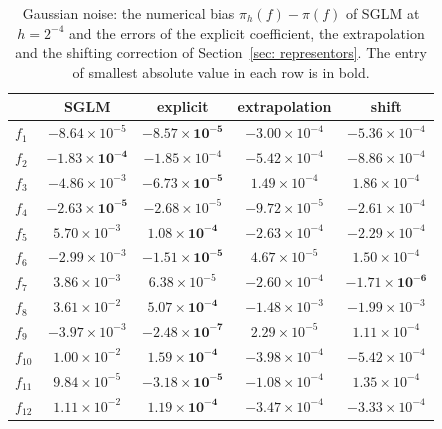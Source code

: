 \begin{table}[htb]
\centering
\small
\begin{tabular}{lcccc}
\toprule
 & SGLM & explicit & extrapolation & shift \\
\midrule
$f_{1}$ & $-8.64\times10^{-5}$ & $\boldsymbol{-8.57\times10^{-5}}$ & $-3.00\times10^{-4}$ & $-5.36\times10^{-4}$ \\
$f_{2}$ & $\boldsymbol{-1.83\times10^{-4}}$ & $-1.85\times10^{-4}$ & $-5.42\times10^{-4}$ & $-8.86\times10^{-4}$ \\
$f_{3}$ & $-4.86\times10^{-3}$ & $\boldsymbol{-6.73\times10^{-5}}$ & $1.49\times10^{-4}$ & $1.86\times10^{-4}$ \\
$f_{4}$ & $\boldsymbol{-2.63\times10^{-5}}$ & $-2.68\times10^{-5}$ & $-9.72\times10^{-5}$ & $-2.61\times10^{-4}$ \\
$f_{5}$ & $5.70\times10^{-3}$ & $\boldsymbol{1.08\times10^{-4}}$ & $-2.63\times10^{-4}$ & $-2.29\times10^{-4}$ \\
$f_{6}$ & $-2.99\times10^{-3}$ & $\boldsymbol{-1.51\times10^{-5}}$ & $4.67\times10^{-5}$ & $1.50\times10^{-4}$ \\
$f_{7}$ & $3.86\times10^{-3}$ & $6.38\times10^{-5}$ & $-2.60\times10^{-4}$ & $\boldsymbol{-1.71\times10^{-6}}$ \\
$f_{8}$ & $3.61\times10^{-2}$ & $\boldsymbol{5.07\times10^{-4}}$ & $-1.48\times10^{-3}$ & $-1.99\times10^{-3}$ \\
$f_{9}$ & $-3.97\times10^{-3}$ & $\boldsymbol{-2.48\times10^{-7}}$ & $2.29\times10^{-5}$ & $1.11\times10^{-4}$ \\
$f_{10}$ & $1.00\times10^{-2}$ & $\boldsymbol{1.59\times10^{-4}}$ & $-3.98\times10^{-4}$ & $-5.42\times10^{-4}$ \\
$f_{11}$ & $9.84\times10^{-5}$ & $\boldsymbol{-3.18\times10^{-5}}$ & $-1.08\times10^{-4}$ & $1.35\times10^{-4}$ \\
$f_{12}$ & $1.11\times10^{-2}$ & $\boldsymbol{1.19\times10^{-4}}$ & $-3.47\times10^{-4}$ & $-3.33\times10^{-4}$ \\
\bottomrule
\end{tabular}
\caption{Gaussian noise: the numerical bias $\pi_h(f) - \pi(f)$ of SGLM at $h = 2^{-4}$ and the errors of the explicit coefficient, the extrapolation and the shifting correction of Section~\ref{sec: representors}. The entry of smallest absolute value in each row is in bold.}
\label{tab: bias correction gaussian}
\end{table}

